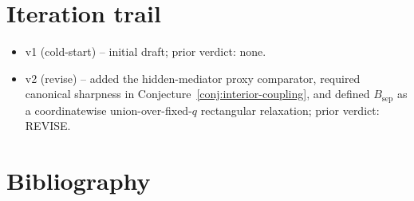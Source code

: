 \documentclass[11pt]{article}
\theoremstyle{definition}
\theoremstyle{plain}
\theoremstyle{remark}
\begin{document}
\section{Iteration trail}
\begin{itemize}[leftmargin=*]
\item v1 (cold-start) -- initial draft; prior verdict: none.
\item v2 (revise) -- added the hidden-mediator proxy comparator, required
canonical sharpness in Conjecture~\ref{conj:interior-coupling}, and defined
\(B_{\mathrm{sep}}\) as a coordinatewise union-over-fixed-\(q\) rectangular
relaxation; prior verdict: REVISE.
\end{itemize}

\section*{Bibliography}
\end{document}
